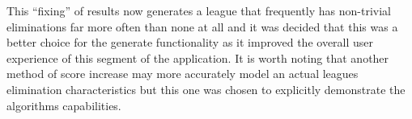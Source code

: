 This ``fixing'' of results now generates a league that frequently has
non-trivial eliminations far more often than none at all and it was
decided that this was a better choice for the generate functionality
as it improved the overall user experience of this segment of the
application. It is worth noting that another method of score increase
may more accurately model an actual leagues elimination
characteristics but this one was chosen to explicitly demonstrate the
algorithms capabilities.
